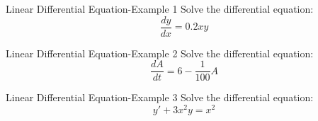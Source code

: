 \begin{example}[]{Linear Differential Equation-Example 1}
  Solve the differential equation:
  \begin{equation*}
    \frac{dy}{dx} = 0.2 xy
  \end{equation*}

  \tcblower

\end{example}

\begin{example}[]{Linear Differential Equation-Example 2}
  Solve the differential equation:
  \begin{equation*}
    \frac{dA}{dt} = 6 - \frac{1}{100} A
  \end{equation*}

  \tcblower

\end{example}

\begin{example}[]{Linear Differential Equation-Example 3}
  Solve the differential equation:
  \begin{equation*}
    y' + 3x^{2} y = x^{2}
  \end{equation*}

  \tcblower

\end{example}
